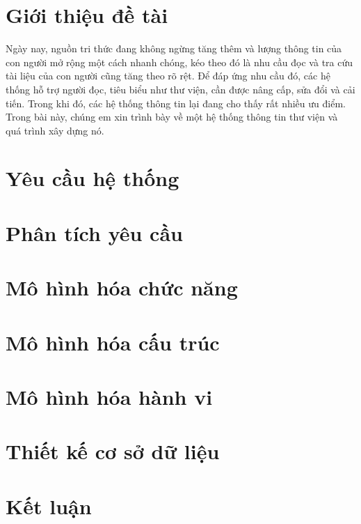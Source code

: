 \documentclass[12pt]{report}
\begin{document}


\tableofcontents 
\newpage

\newpage
\setcounter{page}{1}

\section{Giới thiệu đề tài}
Ngày nay, nguồn tri thức đang không ngừng tăng thêm và lượng thông tin của con người mở rộng một cách nhanh chóng, 
kéo theo đó là nhu cầu đọc và tra cứu tài liệu của con người cũng tăng theo rõ rệt. 
Để đáp ứng nhu cầu đó, các hệ thống hỗ trợ người đọc, tiêu biểu như thư viện, cần được nâng cấp, 
sửa đổi và cải tiến. Trong khi đó, các hệ thống thông tin lại đang cho thấy rất nhiều ưu điểm. 
Trong bài này, chúng em xin trình bày về một hệ thống thông tin thư viện và quá trình xây dựng nó.

\section{Yêu cầu hệ thống}


\section{Phân tích yêu cầu}


\section{Mô hình hóa chức năng}


\section{Mô hình hóa cấu trúc}


\section{Mô hình hóa hành vi}


\section{Thiết kế cơ sở dữ liệu}


\section{Kết luận}

\end{document}
